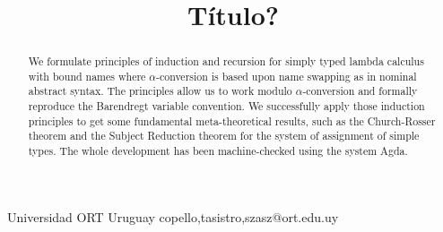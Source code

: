 \documentclass[preprint,10pt]{sigplanconf}
\newcommand{\alp}{\ensuremath{\alpha}}
\begin{document}
\setlength{\pdfpageheight}{\paperheight}
\setlength{\pdfpagewidth}{\paperwidth}




\title{Título?}

           {Universidad ORT Uruguay}
           {copello,tasistro,szasz@ort.edu.uy}

\maketitle

\begin{abstract}
We formulate principles of induction and recursion for simply typed lambda calculus with bound names where \alp-conversion is based upon name swapping as in nominal abstract syntax. The principles allow us to work modulo \alp-conversion and formally reproduce the Barendregt variable convention. We successfully apply those induction principles to get some fundamental meta-theoretical results, such as the Church-Rosser theorem and the Subject Reduction theorem for the system of assignment of simple types. The whole development has been machine-checked using the system Agda. 
\end{abstract}


\end{document}
